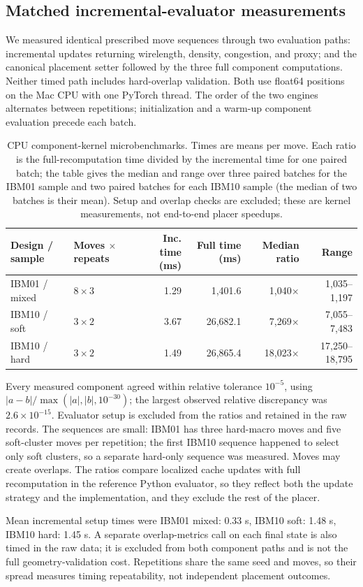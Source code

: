 \subsection{Matched incremental-evaluator measurements}
\label{sec:evaluator}
We measured identical prescribed move sequences through two evaluation paths: incremental updates returning wirelength, density, congestion, and proxy; and the canonical placement setter followed by the three full component computations. Neither timed path includes hard-overlap validation. Both use float64 positions on the Mac CPU with one PyTorch thread. The order of the two engines alternates between repetitions; initialization and a warm-up component evaluation precede each batch.

\begin{table}[htbp]\centering\footnotesize
\caption{CPU component-kernel microbenchmarks. Times are means per move. Each ratio is the full-recomputation time divided by the incremental time for one paired batch; the table gives the median and range over three paired batches for the IBM01 sample and two paired batches for each IBM10 sample (the median of two batches is their mean). Setup and overlap checks are excluded; these are kernel measurements, not end-to-end placer speedups.}
\label{tab:incremental-measurements}
\begin{tabular}{llrrrr}
\toprule
Design / sample & Moves $\times$ repeats & Inc. time (ms) & Full time (ms) & Median ratio & Range \\
\midrule
IBM01 / mixed & $8 \times 3$ & 1.29 & 1{,}401.6 & 1{,}040$\times$ & 1{,}035--1{,}197 \\
IBM10 / soft & $3 \times 2$ & 3.67 & 26{,}682.1 & 7{,}269$\times$ & 7{,}055--7{,}483 \\
IBM10 / hard & $3 \times 2$ & 1.49 & 26{,}865.4 & 18{,}023$\times$ & 17{,}250--18{,}795 \\
\bottomrule\end{tabular}\end{table}

Every measured component agreed within relative tolerance $10^{-5}$, using $|a-b|/\max(|a|,|b|,10^{-30})$; the largest observed relative discrepancy was $2.6\times 10^{-15}$. Evaluator setup is excluded from the ratios and retained in the raw records. The sequences are small: IBM01 has three hard-macro moves and five soft-cluster moves per repetition; the first IBM10 sequence happened to select only soft clusters, so a separate hard-only sequence was measured. Moves may create overlaps. The ratios compare localized cache updates with full recomputation in the reference Python evaluator, so they reflect both the update strategy and the implementation, and they exclude the rest of the placer.

Mean incremental setup times were IBM01 mixed: 0.33 s, IBM10 soft: 1.48 s, IBM10 hard: 1.45 s. A separate overlap-metrics call on each final state is also timed in the raw data; it is excluded from both component paths and is not the full geometry-validation cost. Repetitions share the same seed and moves, so their spread measures timing repeatability, not independent placement outcomes.
